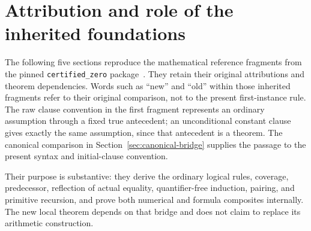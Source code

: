 \clearpage
\appendix
\section*{Attribution and role of the inherited foundations}

The following five sections reproduce the mathematical reference fragments
from the pinned \texttt{certified\_zero} package~\cite{baseline}.
They retain their original attributions and theorem dependencies.
Words such as ``new'' and ``old'' within those inherited fragments refer
to their original comparison, not to the present first-instance rule.
The raw clause convention in the first fragment represents an ordinary
assumption through a fixed true antecedent; an unconditional constant
clause gives exactly the same assumption, since that antecedent is a
theorem. The canonical comparison in
Section~\ref{sec:canonical-bridge} supplies the passage to the present
syntax and initial-clause convention.

Their purpose is substantive: they derive the ordinary logical rules,
coverage, predecessor, reflection of actual equality, quantifier-free
induction, pairing, and primitive recursion, and prove both numerical
and formula composites internally. The new local theorem depends on
that bridge and does not claim to replace its arithmetic construction.

